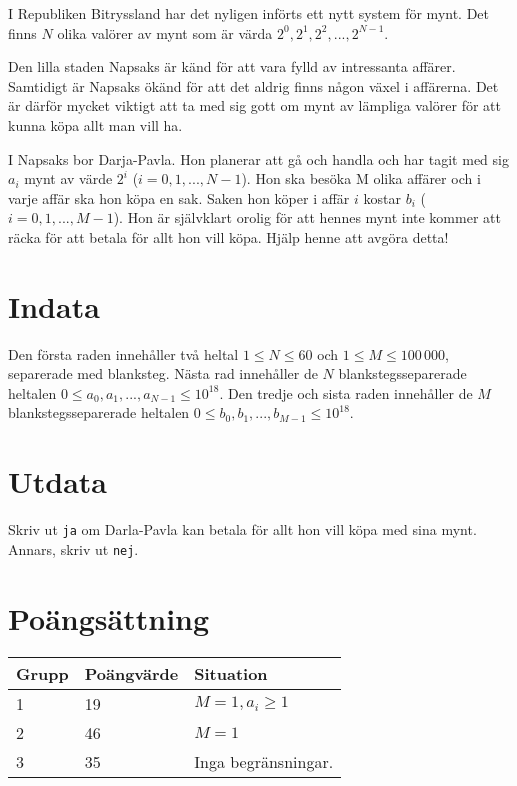 I Republiken Bitryssland har det nyligen införts ett nytt system för mynt.
Det finns $N$ olika valörer av mynt som är värda $2^0, 2^1, 2^2, ..., 2^{N-1}$. 

Den lilla staden Napsaks är känd för att vara fylld av intressanta affärer.
Samtidigt är Napsaks ökänd för att det aldrig finns någon växel i affärerna.
Det är därför mycket viktigt att ta med sig gott om mynt av lämpliga valörer för att kunna köpa allt man vill ha. 

I Napsaks bor Darja-Pavla.
Hon planerar att gå och handla och har tagit med sig $a_i$ mynt av värde $2^i$ ($i = 0, 1, ..., N-1$).
Hon ska besöka M olika affärer och i varje affär ska hon köpa en sak.
Saken hon köper i affär $i$ kostar $b_i$ ($i = 0, 1, ..., M-1$).
Hon är självklart orolig för att hennes mynt inte kommer att räcka för att betala för allt hon vill köpa. Hjälp henne att avgöra detta!

\section*{Indata}
Den första raden innehåller två heltal $1 \le N \le 60$ och $1 \le M \le 100\,000$, separerade med blanksteg.
Nästa rad innehåller de $N$ blankstegsseparerade heltalen $0 \le a_0, a_1, ..., a_{N-1} \le 10^{18}$.
Den tredje och sista raden innehåller de $M$ blankstegsseparerade heltalen $0 \le b_0, b_1, ..., b_{M-1} \le 10^{18}$.

\section*{Utdata}
Skriv ut \texttt{ja} om Darla-Pavla kan betala för allt hon vill köpa med sina mynt.
Annars, skriv ut \texttt{nej}.

\section*{Poängsättning}
\begin{tabular}{| l | l | l |}
\hline
Grupp & Poängvärde & Situation \\ \hline
1     & 19         & $M = 1, a_i \ge 1$ \\ \hline
2     & 46         & $M = 1$ \\ \hline
3     & 35         & Inga begränsningar. \\ \hline
\end{tabular}
